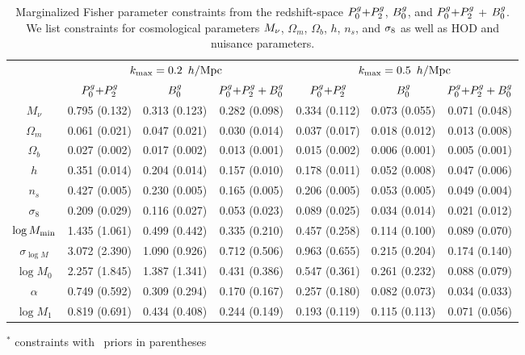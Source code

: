 \begin{table}
    \caption{Marginalized Fisher parameter constraints from the redshift-space 
    $P^g_0{+}P^g_2$, $B^g_0$, and $P^g_0{+}P^g_2$ + $B^g_0$. We list constraints for cosmological 
    parameters $M_\nu$, $\Omega_m$, $\Omega_b$, $h$, $n_s$, and $\sigma_8$ as well 
    as HOD and nuisance parameters.} 
\begin{center} 
    \begin{tabular}{c|ccc|ccc} \hline
        & \multicolumn{3}{c}{$k_{\rm max}=0.2~\,h/\mathrm{Mpc}$} & \multicolumn{3}{c}{$k_{\rm max}=0.5~\,h/\mathrm{Mpc}$} \\ %
        & $P^g_0{+}P^g_2$ & $B^g_0$ & $P^g_0{+}P^g_2 + B^g_0$ & $P^g_0{+}P^g_2$ & $B^g_0$ & $P^g_0{+}P^g_2 + B^g_0$ \\[3pt] \hline 
$M_\nu$     &  0.795 (0.132) & 0.313 (0.123) & 0.282 (0.098) & 0.334 (0.112) & 0.073 (0.055) & 0.071 (0.048)  \\
$\Omega_m$  &  0.061 (0.021) & 0.047 (0.021) & 0.030 (0.014) & 0.037 (0.017) & 0.018 (0.012) & 0.013 (0.008)  \\
$\Omega_b$  &  0.027 (0.002) & 0.017 (0.002) & 0.013 (0.001) & 0.015 (0.002) & 0.006 (0.001) & 0.005 (0.001)  \\
$h$         &  0.351 (0.014) & 0.204 (0.014) & 0.157 (0.010) & 0.178 (0.011) & 0.052 (0.008) & 0.047 (0.006)  \\
$n_s$       &  0.427 (0.005) & 0.230 (0.005) & 0.165 (0.005) & 0.206 (0.005) & 0.053 (0.005) & 0.049 (0.004)  \\
$\sigma_8$  &  0.209 (0.029) & 0.116 (0.027) & 0.053 (0.023) & 0.089 (0.025) & 0.034 (0.014) & 0.021 (0.012)  \\ [3pt] \hline
$\log M_{\rm min}$ &  1.435 (1.061) & 0.499 (0.442) & 0.335 (0.210) & 0.457 (0.258) & 0.114 (0.100) & 0.089 (0.070)  \\
$\sigma_{\log M}$ &  3.072 (2.390) & 1.090 (0.926) & 0.712 (0.506) & 0.963 (0.655) & 0.215 (0.204) & 0.174 (0.140)  \\
$\log M_0$ &  2.257 (1.845) & 1.387 (1.341) & 0.431 (0.386) & 0.547 (0.361) & 0.261 (0.232) & 0.088 (0.079)  \\
$\alpha$ &  0.749 (0.592) & 0.309 (0.294) & 0.170 (0.167) & 0.257 (0.180) & 0.082 (0.073) & 0.034 (0.033)  \\
$\log M_1$ &  0.819 (0.691) & 0.434 (0.408) & 0.244 (0.149) & 0.193 (0.119) & 0.115 (0.113) & 0.071 (0.056)  \\
        [3pt]
\hline                                 
\end{tabular} \label{tab:forecast}
\end{center}
{$^*$ constraints with \planck~priors in parentheses}
\end{table}

